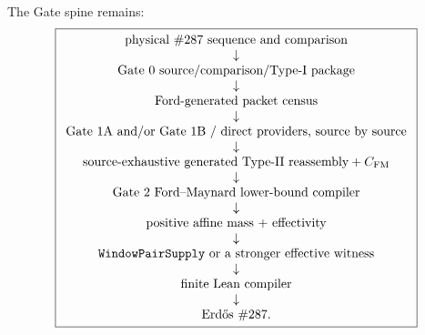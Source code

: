 \documentclass[11pt]{article}
\theoremstyle{definition}
\newcommand{\1}{\mathbf 1}
\begin{document}
The Gate spine remains:
\[
\boxed{
\begin{array}{c}
\text{physical \#287 sequence and comparison}\\
\downarrow\\
\text{Gate 0 source/comparison/Type-I package}\\
\downarrow\\
\text{Ford-generated packet census}\\
\downarrow\\
\text{Gate 1A and/or Gate 1B / direct providers, source by source}\\
\downarrow\\
\text{source-exhaustive generated Type-II reassembly}+C_{\rm FM}\\
\downarrow\\
\text{Gate 2 Ford--Maynard lower-bound compiler}\\
\downarrow\\
\text{positive affine mass + effectivity}\\
\downarrow\\
\texttt{WindowPairSupply}\ \text{or a stronger effective witness}\\
\downarrow\\
\text{finite Lean compiler}\\
\downarrow\\
\text{Erd\H{o}s \#287}.
\end{array}}
\]
\end{document}
